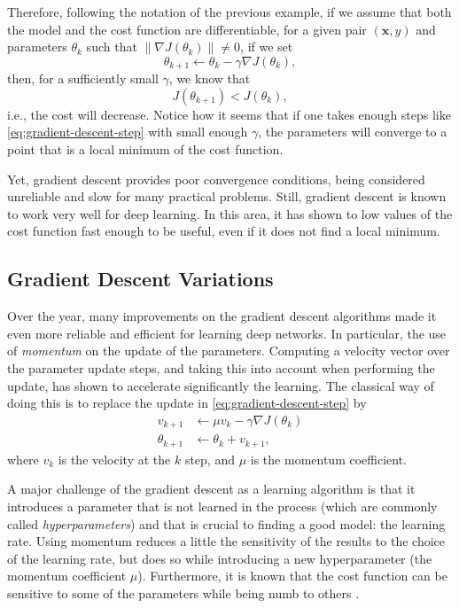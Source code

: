 Therefore, following the notation of the previous example, if we assume that both the model and the cost function are differentiable, for a given pair $(\bm{x},y)$ and parameters $\theta_k$ such that $\| \nabla J(\theta_k) \| \neq 0$, if we set \[
\theta_{k+1} \gets \theta_k - \gamma \nabla J(\theta_k) \tag{$*$}\label{eq:gradient-descent-step}
,\] then, for a sufficiently small $\gamma$, we know that \[
J\left( \theta_{k+1} \right) < J\left( \theta_k \right) 
,\] i.e., the cost will decrease.
Notice how it seems that if one takes enough steps like \eqref{eq:gradient-descent-step} with small enough $\gamma$, the parameters will converge to a point that is a local minimum of the cost function.


Yet, gradient descent provides poor convergence conditions\cite{wolfe_convergence_1969}, being considered unreliable and slow for many practical problems.
Still, gradient descent is known to work very well for deep learning.
In this area, it has shown to low values of the cost function fast enough to be useful, even if it does not find a local minimum.
\cite{goodfellow_deep_2016}

\subsection{Gradient Descent Variations}

Over the year, many improvements on the gradient descent algorithms made it even more reliable and efficient for learning deep networks.
In particular, the use of \textit{momentum} on the update of the parameters.
Computing a velocity vector over the parameter update steps, and taking this into account when performing the update, has shown to accelerate significantly the learning\cite{sutskever_importance_2013}.
The classical way of doing this is to replace the update in \eqref{eq:gradient-descent-step} by
\begin{align*}
    v_{k+1} &\gets \mu v_k - \gamma \nabla J(\theta_k) \\
    \theta_{k+1} &\gets \theta_k + v_{k+1}
,\end{align*}
where $v_k$ is the velocity at the $k$ step, and $\mu$ is the momentum coefficient.

A major challenge of the gradient descent as a learning algorithm is that it introduces a parameter that is not learned in the process (which are commonly called \emph{hyperparameters}) and that is crucial to finding a good model: the learning rate.
Using momentum reduces a little the sensitivity of the results to the choice of the learning rate, but does so while introducing a new hyperparameter (the momentum coefficient $\mu$).
Furthermore, it is known that the cost function can be sensitive to some of the parameters while being numb to others \cite{goodfellow_deep_2016}.

